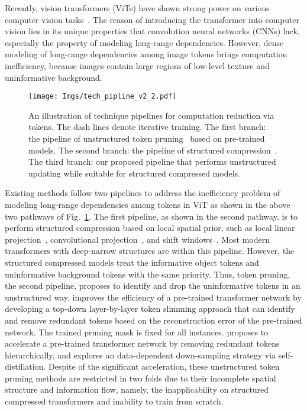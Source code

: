 \documentclass[letterpaper]{article} \usepackage{aaai22}  \usepackage{times}  \usepackage{helvet}  \usepackage{courier}  \usepackage[hyphens]{url}  \usepackage{graphicx} \urlstyle{rm} \def\UrlFont{\rm}  \usepackage{natbib}  \usepackage{caption} \DeclareCaptionStyle{ruled}{labelfont=normalfont,labelsep=colon,strut=off} \frenchspacing  \setlength{\pdfpagewidth}{8.5in}  \setlength{\pdfpageheight}{11in}  \usepackage{algorithm}
\begin{document}
Recently, vision transformers (ViTs) have shown strong power on various computer vision tasks~\cite{survey4}.
The reason of introducing the transformer into computer vision lies in its unique properties that convolution neural networks (CNNs) lack, especially the property of modeling long-range dependencies. However, dense modeling of long-range dependencies among image tokens brings computation inefficiency, because images contain large regions of low-level texture and uninformative background.




\begin{figure}[t]
    \centering
    \texttt{[image: Imgs/tech\_pipline\_v2\_2.pdf]} \caption{An illustration of technique pipelines for computation reduction via tokens. The dash lines denote iterative training. The first branch: the pipeline of unstructured token pruning~\cite{DynamicViT,PatchSlimming} based on pre-trained models. The second branch: the pipeline of structured compression~\cite{LeViT}. The third branch: our proposed pipeline that performs unstructured updating while suitable for structured compressed models.}
    \label{fig:tech_pipline}
    \vspace{-4mm}
\end{figure} 
Existing methods follow two pipelines to address the inefficiency problem of modeling long-range dependencies among tokens in ViT as shown in the above two pathways of Fig.~\ref{fig:tech_pipline}. The first pipeline, as shown in the second pathway, is to perform structured compression based on local spatial prior,
such as local linear projection~\cite{PVT}, convolutional projection~\cite{PiT}, and shift windows~\cite{SwinT}. Most modern transformers with deep-narrow structures are within this pipeline. However, the structured compressed models treat the informative object tokens and uninformative background tokens with the same priority.
Thus, token pruning, the second pipeline, proposes to identify and drop the uninformative tokens in an unstructured way. \cite{PatchSlimming} improves the efficiency of a pre-trained transformer network by developing a top-down layer-by-layer token slimming approach that can identify and remove redundant tokens based on the reconstruction error of the pre-trained network. The trained pruning mask is fixed for all instances. \cite{DynamicViT} proposes to accelerate a pre-trained transformer network by removing redundant tokens hierarchically, and explores an data-dependent down-sampling strategy via self-distillation.
Despite of the significant acceleration, these unstructured token pruning methods are restricted in two folds due to their incomplete spatial structure and information flow, namely, the inapplicability on structured compressed transformers and inability to train from scratch.
\end{document}
